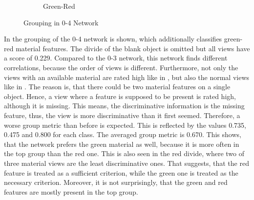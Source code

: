 \begin{figure}
\begin{subfigure}{\textwidth}
		\caption{Green-Red}
		\label{fig:grouping-0-4-green-red}
	\end{subfigure}
	\caption[Grouping in 0-4 Network]{Grouping in 0-4 Network}
	\label{fig:grouping-0-4}
\end{figure}
In  the grouping of the 0-4 network is shown, which additionally classifies green-red material features.
The divide of the blank object is omitted but all views have a score of 0.229.
Compared to the 0-3 network, this network finds different correlations, because the order of views is different.
Furthermore, not only the views with an available material are rated high like in , but also the normal views like in .
The reason is, that there could be two material features on a single object.
Hence, a view where a feature is supposed to be present is rated high, although it is missing.
This means, the discriminative information is the missing feature, thus, the view is more discriminative than it first seemed.
Therefore, a worse group metric than before is expected.
This is reflected by the values 0.735, 0.475 and 0.800 for each class.
The averaged group metric is 0.670.
This shows, that the network prefers the green material as well, because it is more often in the top group than the red one.
This is also seen in the red divide, where two of three material views are the least discriminative ones.
That suggests, that the red feature is treated as a sufficient criterion, while the green one is treated as the necessary criterion.
Moreover, it is not surprisingly, that the green and red features are mostly present in the top group.
